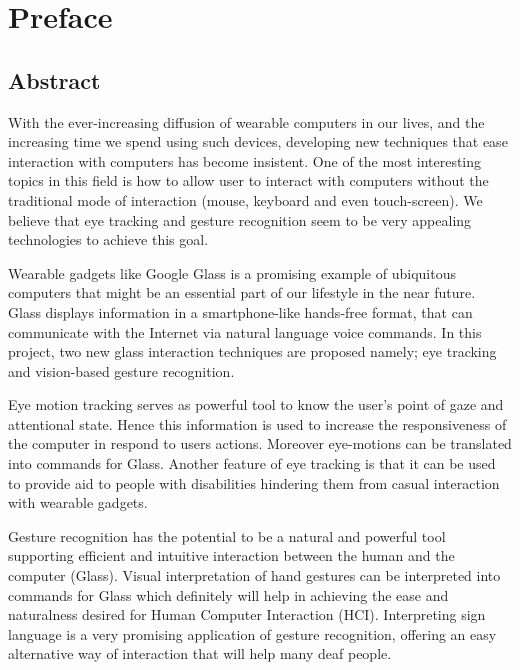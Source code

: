 

\chapter*{Preface} 
\section*{Abstract} 
With the ever-increasing diffusion of wearable computers in our lives, and the increasing time we spend using such devices, developing new techniques that ease interaction with computers has become insistent. One of the most interesting topics in this field is how to allow user to interact with computers without the traditional mode of interaction (mouse, keyboard and even touch-screen). We believe that eye tracking and gesture recognition seem to be very appealing technologies to achieve this goal.\bigskip

Wearable gadgets like Google Glass is a promising example of ubiquitous computers that might be an essential part of our lifestyle in the near future. Glass displays information in a smartphone-like hands-free format, that can communicate with the Internet via natural language voice commands. In this project, two new glass interaction techniques are proposed namely; eye tracking and vision-based gesture recognition.\bigskip

Eye motion tracking serves as powerful tool to know the user's point of gaze and attentional state. Hence this information is used to increase the responsiveness of the computer in respond to users actions. Moreover eye-motions can be translated into commands for Glass. Another feature of eye tracking is that it can be used to provide aid to people with disabilities hindering them from casual interaction with wearable gadgets.\bigskip

Gesture recognition has the potential to be a natural and powerful tool supporting efficient and intuitive interaction between the human and the computer (Glass). Visual interpretation of hand gestures can be interpreted into commands for Glass which definitely will help in achieving the ease and naturalness desired for Human Computer Interaction (HCI). Interpreting sign language is a very promising application of gesture recognition, offering an easy alternative way of interaction that will help many deaf people.